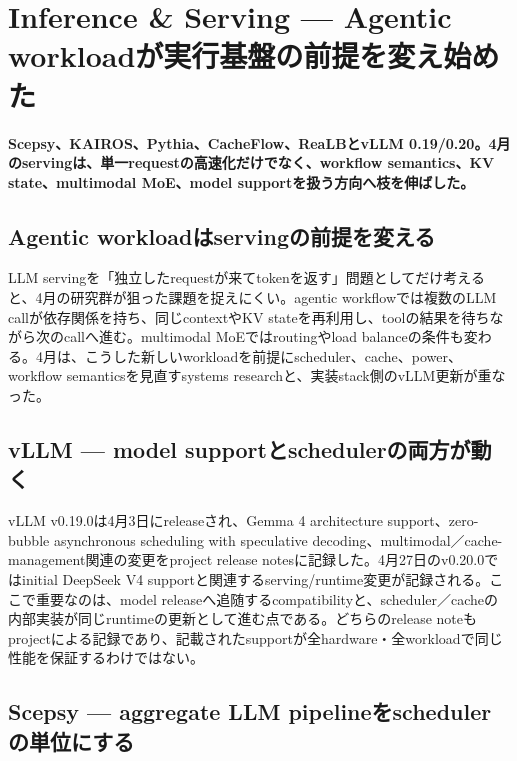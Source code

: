 \section{Inference \& Serving — Agentic workloadが実行基盤の前提を変え始めた}
\label{pkg:inference-serving-april}
\noindent\textbf{Scepsy、KAIROS、Pythia、CacheFlow、ReaLBとvLLM 0.19/0.20。4月のservingは、単一requestの高速化だけでなく、workflow semantics、KV state、multimodal MoE、model supportを扱う方向へ枝を伸ばした。}\autocite{src-0fc9d11483aa,src-2a6eae37bd39,src-551442a9e215,src-b790ec92aa01,src-d91793d0a6fa,src-e1e959857ced,src-fe12f92c05d7}

\subsection{Agentic workloadはservingの前提を変える}

LLM servingを「独立したrequestが来てtokenを返す」問題としてだけ考えると、4月の研究群が狙った課題を捉えにくい。agentic workflowでは複数のLLM callが依存関係を持ち、同じcontextやKV stateを再利用し、toolの結果を待ちながら次のcallへ進む。multimodal MoEではroutingやload balanceの条件も変わる。4月は、こうした新しいworkloadを前提にscheduler、cache、power、workflow semanticsを見直すsystems researchと、実装stack側のvLLM更新が重なった。\autocite{src-0fc9d11483aa,src-2a6eae37bd39,src-551442a9e215,src-b790ec92aa01,src-d91793d0a6fa,src-e1e959857ced,src-fe12f92c05d7}


\subsection{vLLM — model supportとschedulerの両方が動く}

vLLM v0.19.0は4月3日にreleaseされ、Gemma 4 architecture support、zero-bubble asynchronous scheduling with speculative decoding、multimodal／cache-management関連の変更をproject release notesに記録した。4月27日のv0.20.0ではinitial DeepSeek V4 supportと関連するserving/runtime変更が記録される。ここで重要なのは、model releaseへ追随するcompatibilityと、scheduler／cacheの内部実装が同じruntimeの更新として進む点である。どちらのrelease noteもprojectによる記録であり、記載されたsupportが全hardware・全workloadで同じ性能を保証するわけではない。\autocite{src-b790ec92aa01,src-fe12f92c05d7}


\subsection{Scepsy — aggregate LLM pipelineをschedulerの単位にする}

